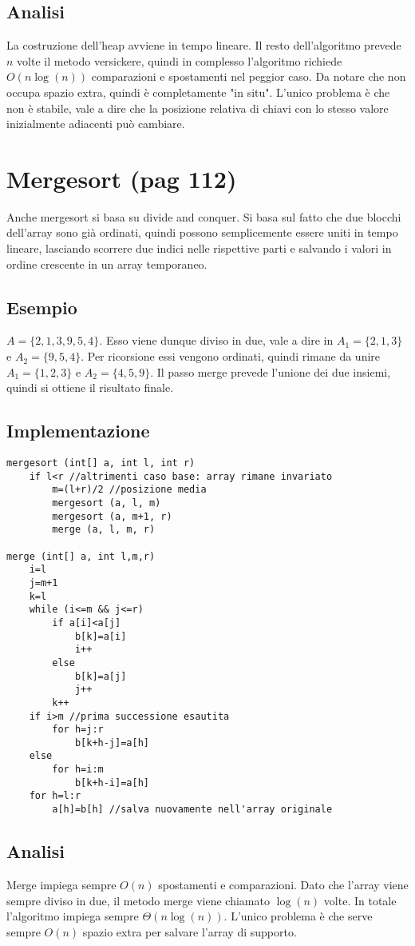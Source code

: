 \documentclass[a4paper]{book}
\begin{document}
\subsection*{Analisi}
La costruzione dell'heap avviene in tempo lineare. Il resto dell'algoritmo prevede $n$ volte il metodo versickere, quindi in complesso l'algoritmo richiede $O(n \log (n))$ comparazioni e spostamenti nel peggior caso. Da notare che non occupa spazio extra, quindi è completamente "in situ". L'unico problema è che non è stabile, vale a dire che la posizione relativa di chiavi con lo stesso valore inizialmente adiacenti può cambiare. 

\section{Mergesort (pag 112)}
Anche mergesort si basa su divide and conquer. Si basa sul fatto che due blocchi dell'array sono già ordinati, quindi possono semplicemente essere uniti in tempo lineare, lasciando scorrere due indici nelle rispettive parti e salvando i valori in ordine crescente in un array temporaneo.

\subsection*{Esempio}
$A=\{2, 1, 3, 9, 5, 4\}$. Esso viene dunque diviso in due, vale a dire in $A_1 =\{2,1,3\}$ e $A_2 =\{9,5,4\}$. Per ricorsione essi vengono ordinati, quindi rimane da unire $A_1 =\{1,2,3\}$ e $A_2 =\{4,5,9\}$. Il passo merge prevede l'unione dei due insiemi, quindi si ottiene il risultato finale.

\subsection*{Implementazione}
\begin{lstlisting}
mergesort (int[] a, int l, int r)
	if l<r //altrimenti caso base: array rimane invariato
		m=(l+r)/2 //posizione media
		mergesort (a, l, m)
		mergesort (a, m+1, r)
		merge (a, l, m, r)
		
merge (int[] a, int l,m,r)
	i=l
	j=m+1
	k=l
	while (i<=m && j<=r)
		if a[i]<a[j]
			b[k]=a[i]
			i++
		else
			b[k]=a[j]
			j++
		k++
	if i>m //prima successione esautita
		for h=j:r
			b[k+h-j]=a[h]
	else
		for h=i:m
			b[k+h-i]=a[h]
	for h=l:r
		a[h]=b[h] //salva nuovamente nell'array originale									
\end{lstlisting}
\subsection*{Analisi}
Merge impiega sempre $O(n)$ spostamenti e comparazioni. Dato che l'array viene sempre diviso in due, il metodo merge viene chiamato $\log(n)$ volte. In totale l'algoritmo impiega sempre $\Theta (n \log(n))$. L'unico problema è che serve sempre $O(n)$ spazio extra per salvare l'array di supporto.
\end{document}
